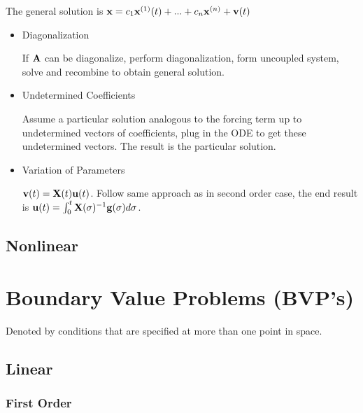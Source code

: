 \documentclass[a4paper,12pt]{article}
\begin{document}
\begin{itemize}
		The general solution is $\bold{x}=c_1\bold{x}^{(1)}(t)+...+c_n\bold{x}^{(n)}+\bold{v}(t)$
			\begin{itemize}
			\item{Diagonalization}
			
			If $\bold{A}$ can be diagonalize, perform diagonalization, form uncoupled system, solve and recombine to obtain general solution. 
			\item{Undetermined Coefficients}
			
			Assume a particular solution analogous to the forcing term up to undetermined vectors of coefficients, plug in the ODE to get these undetermined vectors. The result is the particular solution.
			\item{Variation of Parameters}
			
			$\bold{v}(t)=\bold{X}(t)\bold{u}(t)$. Follow same approach as in second order case, the end result is $\bold{u}(t)=\int_0^t\bold{X}(\sigma)^{-1}\bold{g}(\sigma)d\sigma$.
			\end{itemize}
		\end{itemize}
\subsection{Nonlinear}

\section{Boundary Value Problems (BVP's)}
Denoted by conditions that are specified at more than one point in space.
\subsection{Linear}
\subsubsection{ First Order}
\end{document}
